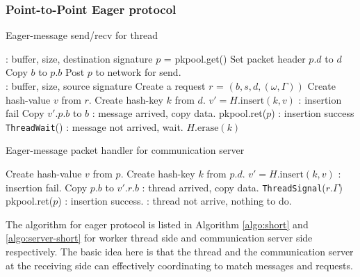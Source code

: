 \documentclass{sig-alternate-05-2015}
\begin{document}
\subsubsection{Point-to-Point Eager protocol}

\begin{algorithm}
  \caption{Eager-message send/recv for thread}
  \label{algo:short}
  \begin{algorithmic}[1] %
     \Comment: buffer, size, destination signature 
      \State $p$ = pkpool.get()
      \State Set packet header $p.d$ to $d$
      \State Copy $b$ to $p.b$
      \State Post $p$ to network for send.
    \EndProcedure
    \\
     \Comment: buffer, size, source signature 
      \State Create a request $r$ = $(b,s,d, (\omega, \Gamma))$
      \State Create hash-value $v$ from $r$.
      \State Create hash-key $k$ from $d$.
      \State $v' = H.\text{insert}(k,v)$
        \Comment: insertion fail
        \State Copy $v'.p.b$ to $b$
        \Comment: message arrived, copy data.
        \State pkpool.ret($p$)
      \Else
        \Comment: insertion success
        \State \texttt{ThreadWait}()
        \Comment: message not arrived, wait.
      \EndIf
      \State $H.\text{erase}(k)$
    \EndProcedure
  \end{algorithmic}
\end{algorithm}

\begin{algorithm}
  \caption{Eager-message packet handler for communication server}
  \label{algo:server-short}
  \begin{algorithmic}[1]
      \State Create hash-value $v$ from $p$.
      \State Create hash-key $k$ from $p.d$.
      \State $v' = H.\text{insert}(k,v)$
        \Comment: insertion fail.
        \State Copy $p.b$ to $v'.r.b$
        \Comment: thread arrived, copy data.
        \State \texttt{ThreadSignal}($r.\Gamma$)
        \State pkpool.ret($p$)
      \Else
        \Comment: insertion success.
        \State \Return
        \Comment: thread not arrive, nothing to do.
      \EndIf
    \EndProcedure
  \end{algorithmic}
\end{algorithm}

The algorithm for eager protocol is listed in Algorithm \ref{algo:short} and
\ref{algo:server-short} for worker thread side and communication server side
respectively. The basic idea here is that the thread and the communication
server at the receiving side can effectively coordinating to match messages and
requests.
\end{document}
